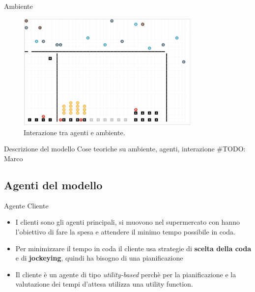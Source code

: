 \begin{frame}{Ambiente}
	\begin{figure}[H]
		\centering
		\includegraphics[width=9cm]{"../report/images/supermarket-execution.png"}
		\caption{Interazione tra agenti e ambiente.}
		\label{fig:supermarket_execution}
	\end{figure}	
\end{frame}




\begin{frame}{Descrizione del modello}
	\centering
	Cose teoriche su ambiente, agenti, interazione
	\#TODO: Marco
\end{frame}



\subsection{Agenti del modello}

\begin{frame}{Agente Cliente}
	\begin{itemize}
		\item I clienti sono gli agenti principali, si muovono nel supermercato con hanno l'obiettivo di fare la spesa e attendere il minimo tempo possibile in coda.
		\item Per minimizzare il tempo in coda il cliente usa strategie di \textbf{scelta della coda} e di \textbf{jockeying}, quindi ha bisogno di una pianificazione
		\item Il cliente è un agente di tipo \textit{utility-based} perchè per la pianificazione e la valutazione dei tempi d'attesa utilizza una utility function. 
	\end{itemize}
\end{frame}

